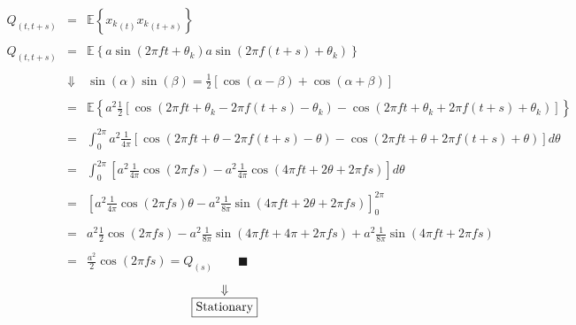 \documentclass[11pt, a4paper]{article}
\begin{document}
\begin{equation}
    \begin{array}{rcl}
        Q_{\left(t,t+s\right)} & = & \displaystyle \mathbb{E}\left\{{x_k}_{\left(t\right)}{x_k}_{\left(t+s\right)}\right\} \\\\
        Q_{\left(t,t+s\right)} & = & \displaystyle \mathbb{E}\left\{a\sin{\left(2\pi ft+\theta_k\right)}a\sin{\left(2\pi f\left(t+s\right)+\theta_k\right)}\right\} \\\\
        & \Downarrow & \displaystyle \sin{\left(\alpha\right)}\sin{\left(\beta\right)}=\frac{1}{2}\left[\cos\left(\alpha-\beta\right)+\cos\left(\alpha+\beta\right)\right] \\\\
        & = & \displaystyle \mathbb{E}\left\{a^2\frac{1}{2}\left[\cos\left(2\pi ft+\theta_k-2\pi f\left(t+s\right)-\theta_k\right)-\cos\left(2\pi ft+\theta_k+2\pi f\left(t+s\right)+\theta_k\right)\right]\right\} \\\\
        & = & \displaystyle \int_{0}^{2\pi}{a^2\frac{1}{4\pi}\left[\cos\left(2\pi ft+\theta-2\pi f\left(t+s\right)-\theta\right)-\cos\left(2\pi ft+\theta+2\pi f\left(t+s\right)+\theta\right)\right]d\theta} \\\\
        & = & \displaystyle \int_{0}^{2\pi}{\left[a^2\frac{1}{4\pi}\cos\left(2\pi fs\right)-a^2\frac{1}{4\pi}\cos\left(4\pi ft+2\theta+2\pi fs\right)\right]d\theta} \\\\
        & = & \displaystyle \left[a^2\frac{1}{4\pi}\cos\left(2\pi fs\right)\theta-a^2\frac{1}{8\pi}\sin\left(4\pi ft+2\theta+2\pi fs\right)\right]_0^{2\pi} \\\\
        & = & \displaystyle a^2\frac{1}{2}\cos\left(2\pi fs\right)-a^2\frac{1}{8\pi}\sin\left(4\pi ft+4\pi+2\pi fs\right)+a^2\frac{1}{8\pi}\sin\left(4\pi ft+2\pi fs\right) \\\\
        & = & \displaystyle \frac{a^2}{2}\cos\left(2\pi fs\right)=Q_{\left(s\right)}\qquad\blacksquare
    \end{array}
\end{equation}
\begin{equation*}
    \begin{array}{c}
        \Downarrow \\
        \boxed{$\text{Stationary}$}
    \end{array}
\end{equation*}
\end{document}
